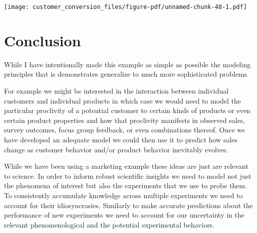 \documentclass[
  letterpaper,
  DIV=11,
  numbers=noendperiod]{scrartcl}
\newenvironment{Shaded}{\begin{snugshade}}{\end{snugshade}}
\newcommand{\AttributeTok}[1]{\textcolor[rgb]{0.40,0.45,0.13}{#1}}
\newcommand{\ControlFlowTok}[1]{\textcolor[rgb]{0.00,0.23,0.31}{#1}}
\newcommand{\DecValTok}[1]{\textcolor[rgb]{0.68,0.00,0.00}{#1}}
\newcommand{\FunctionTok}[1]{\textcolor[rgb]{0.28,0.35,0.67}{#1}}
\newcommand{\NormalTok}[1]{\textcolor[rgb]{0.00,0.23,0.31}{#1}}
\newcommand{\OtherTok}[1]{\textcolor[rgb]{0.00,0.23,0.31}{#1}}
\newcommand{\SpecialCharTok}[1]{\textcolor[rgb]{0.37,0.37,0.37}{#1}}
\newcommand{\StringTok}[1]{\textcolor[rgb]{0.13,0.47,0.30}{#1}}
\begin{document}
\begin{Shaded}
\end{Shaded}

\texttt{[image: customer\_conversion\_files/figure-pdf/unnamed-chunk-48-1.pdf]}

\section{Conclusion}\label{conclusion}

While I have intentionally made this example as simple as possible the
modeling principles that is demonstrates generalize to much more
sophisticated problems.

For example we might be interested in the interaction between individual
customers and individual products in which case we would need to model
the particular proclivity of a potential customer to certain kinds of
products or even certain product properties and how that proclivity
manifests in observed sales, survey outcomes, focus group feedback, or
even combinations thereof. Once we have developed an adequate model we
could then use it to predict how sales change as customer behavior
and/or product behavior inevitably evolves.

While we have been using a marketing example these ideas are just are
relevant to science. In order to inform robust scientific insights we
need to model not just the phenomena of interest but also the
experiments that we use to probe them. To consistently accumulate
knowledge across multiple experiments we need to account for their
idiosyncrasies. Similarly to make accurate predictions about the
performance of new experiments we need to account for our uncertainty in
the relevant phenomenological and the potential experimental behaviors.
\end{document}
